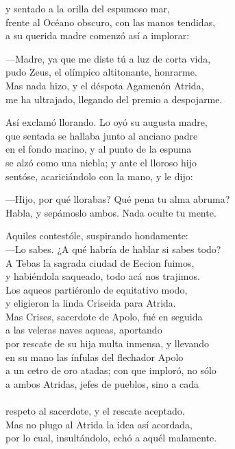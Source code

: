 y sentado a la orilla del espumoso mar,\\
frente al Océano obscuro, con las manos tendidas,\\
a su querida madre comenzó así a implorar:\par
---Madre, ya que me diste tú a luz de corta vida,\\
pudo Zeus, el olímpico altitonante, honrarme.\\
Mas nada hizo, y el déspota Agamenón Atrida,\\
me ha ultrajado, llegando del premio a despojarme.\par
Así exclamó llorando. Lo oyó su augusta madre,\\
que sentada se hallaba junto al anciano padre\\
en el fondo marino, y al punto de la espuma\\
se alzó como una niebla; y ante el lloroso hijo\\
sentóse, acariciándolo con la mano, y le dijo:\par
---Hijo, por qué llorabas? Qué pena tu alma abruma?\\
Habla, y sepámoslo ambos. Nada oculte tu mente.\par
Aquiles contestóle, suspirando hondamente:\\
---Lo sabes. ¿A qué habría de hablar si sabes todo?\\
A Tebas la sagrada ciudad de Eecion fuimos,\\
y habiéndola saqueado, todo acá nos trajimos.\\
Los aqueos partiéronlo de equitativo modo,\\
y eligieron la linda Criseida para Atrida.\\
Mas Crises, sacerdote de Apolo, fué en seguida\\
a las veleras naves aqueas, aportando\\
por rescate de su hija multa inmensa, y llevando\\
en su mano las ínfulas del flechador Apolo\\
a un cetro de oro atadas; con que imploró, no sólo\\
a ambos Atridas, jefes de pueblos, sino a cada\\
\\
respeto al sacerdote, y el rescate aceptado.\\
Mas no plugo al Atrida la idea así acordada,\\
por lo cual, insultándolo, echó a aquél malamente.\\
